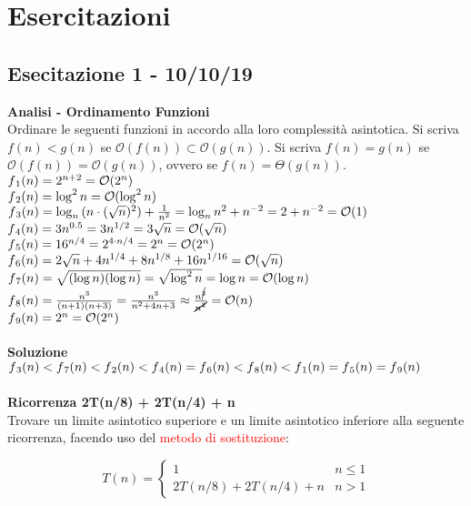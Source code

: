 \documentclass[../cheatSheetAlgoritmi.tex]{subfiles}
\begin{document}
\section{Esercitazioni} 
\subsection{Esecitazione 1 - 10/10/19}
\textbf{Analisi - Ordinamento Funzioni}\\
Ordinare le seguenti funzioni in accordo alla loro complessità asintotica. Si scriva $f(n) < g(n)$ se $\mathcal{O}(f(n)) \subset \mathcal{O}(g(n))$. Si scriva $f(n) = g(n)$ se $\mathcal{O}(f(n)) = \mathcal{O}(g(n))$, ovvero se $f(n) = \Theta(g(n))$.\\
$f\textsubscript{1}(n) = 2^{n+2} = \mathcal{O}(2^{n})$\\
$f\textsubscript{2}(n) = \log^{2}{n} = \mathcal{O}(\log^{2}{n})$\\
$f\textsubscript{3}(n) = \log_{n}{(n \cdot (\sqrt{n})^{2})} + \frac{1}{n^{2}} = \log_{n}{n^{2}} + {n^{-2}} = 2 + {n^{-2}} = \mathcal{O}(1)$\\
$f\textsubscript{4}(n) = 3n^{0.5} = 3n^{1/2} = 3 \sqrt{n} = \mathcal{O}(\sqrt{n})$\\
$f\textsubscript{5}(n) = 16^{n/4} = 2^{4 \cdot n/4} = 2^{n} = \mathcal{O}(2^{n})$\\
$f\textsubscript{6}(n) =2 \sqrt{n} + 4n^{1/4} + 8n^{1/8} + 16n^{1/16} = \mathcal{O}(\sqrt{n})$\\
$f\textsubscript{7}(n) = \sqrt{(\log{n})(\log{n})} = \sqrt{\log^{2}{n}} = \log{n} = \mathcal{O}(\log{n})$\\
$f\textsubscript{8}(n) = \frac{n^3}{(n+1)(n+3)} = \frac{n^3}{n^{2} + 4n + 3} \approx \frac{n^{\cancel{3}}}{\cancel{n^{2}}} = \mathcal{O}(n)$\\
$f\textsubscript{9}(n) = 2^{n} = \mathcal{O}(2^{n})$\\\\
\textbf{Soluzione}\\
$f\textsubscript{3}(n) < f\textsubscript{7}(n) < f\textsubscript{2}(n) < f\textsubscript{4}(n) = f\textsubscript{6}(n) < f\textsubscript{8}(n) < f\textsubscript{1}(n) = f\textsubscript{5}(n) = f\textsubscript{9}(n)$\\\\
\textbf{Ricorrenza 2T(n/8) + 2T(n/4) + n}\\
Trovare un limite asintotico superiore e un limite asintotico inferiore alla seguente ricorrenza, facendo uso del \textcolor{red}{metodo di sostituzione}:
\begin{center}
	\begin{equation*}
		T(n)=\begin{cases}
			1 & \text{$n \leq 1$}\\
			2T(n/8) + 2T(n/4) + n & \text{$n > 1$}
 	 	\end{cases}
	\end{equation*}
\end{center}
\end{document}
